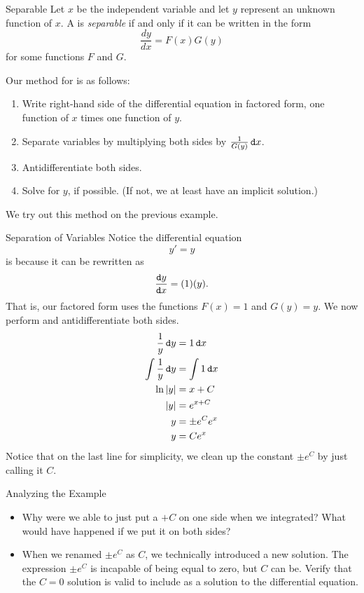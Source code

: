 \begin{definition}{Separable}
Let $x$ be the independent variable and let $y$ represent an unknown function of $x$.  A  is \emph{separable} if and only if it can be written in the form $$ \frac{dy}{dx}=F(x)G(y)$$ for some functions $F$ and $G$. 
\end{definition} 

Our method for  is as follows:

\begin{enumerate}
\item Write right-hand side of the differential equation in factored form, one function of $x$ times one function of $y$. 
\item Separate variables by multiplying both sides by $\frac{1}{G(y)}\mathop{}\!\mathtt{d} x$.
\item Antidifferentiate both sides.   
\item Solve for $y$, if possible.  (If not, we at least have an implicit solution.)
\end{enumerate}

We try out this method on the previous example.

\begin{example}{Separation of Variables}
Notice the differential equation $$y'=y $$ is  because it can be rewritten as  $$\frac{\mathop{}\!\mathtt{d} y}{\mathop{}\!\mathtt{d} x}=(1)(y). $$
That is, our factored form uses the functions $F(x)=1$ and $G(y)=y$.  We now perform  and antidifferentiate both sides.
\begin{align*}
\frac{1}{y}\mathop{}\!\mathtt{d} y &= 1 \mathop{}\!\mathtt{d} x \\
\int \frac{1}{y}\mathop{}\!\mathtt{d} y &=\int 1 \mathop{}\!\mathtt{d} x \\
\ln|y|&=x+C \\
|y|&=e^{x+C} \\
y&=\pm e^{C}e^x \\
y&=Ce^x \\
\end{align*}
Notice that on the last line for simplicity, we clean up the constant $\pm e^C$ by just calling it $C$.
\end{example}

\begin{exercise}{Analyzing the Example \Coffeecup}
\begin{itemize}
\item Why were we able to just put a $+C$ on one side when we integrated?  What would have happened if we put it on both sides? \vspace*{.5in}
\item When we renamed $\pm e^C$ as $C$, we technically introduced a new solution.  The expression $\pm e^C$ is incapable of being equal to zero, but $C$ can be.  Verify that the $C=0$ solution is valid to include as a solution to the differential equation.
 \vspace*{.5in}
\end{itemize}
\end{exercise}

